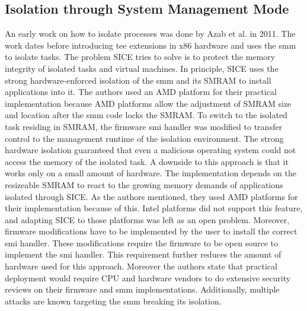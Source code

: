 \subsection{Isolation through System Management Mode}
\label{sec:20:isolation_smm}
An early work on how to isolate processes was done by Azab et al. in
2011.\cite{azab_sice_2011} The work dates before introducing \gls{tee}
extensions in x86 hardware and uses the \gls{smm} to isolate tasks. The problem
SICE tries to solve is to protect the memory integrity of isolated tasks and
virtual machines. In principle, SICE uses the strong hardware-enforced isolation
of the \gls{smm} and its SMRAM to install applications into it. The authors used
an AMD platform for their practical implementation because AMD platforms allow
the adjustment of SMRAM size and location after the \gls{smm} code locks the
SMRAM.\cite{bios2014amd} To switch to the isolated task residing in SMRAM, the
firmware \gls{smi} handler was modified to transfer control to the management
runtime of the isolation environment. The strong hardware isolation guaranteed
that even a malicious operating system could not access the memory of the
isolated task. A downside to this approach is that it works only on a small
amount of hardware. The implementation depends on the resizeable SMRAM to react
to the growing memory demands of applications isolated through SICE. As the
authors mentioned, they used AMD platforms for their implementation because of
this. Intel platforms did not support this feature, and adapting SICE to those
platforms was left as an open problem. Moreover, firmware modifications have to
be implemented by the user to install the correct \gls{smi} handler. These
modifications require the firmware to be open source to implement the \gls{smi}
handler. This requirement further reduces the amount of hardware used for this
approach. Moreover the authors state that practical deployment would require CPU
and hardware vendors to do extensive security reviews on their firmware and
\gls{smm} implementations. Additionally, multiple attacks are known targeting
the \gls{smm} breaking its isolation.\cite{wojtczuk2014attacking,
wojtczuk2009attacking, wojtczuk2009poisining}

